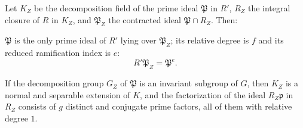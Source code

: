 Let $K_Z$ be the decomposition field of the prime ideal $\mathfrak{P}$ in $R'$, $R_Z$ the integral closure of $R$ in $K_Z$, and $\mathfrak{P}_Z$ the contracted ideal $\mathfrak{P} \cap R_Z$. Then:

$\mathfrak{P}$ is the only prime ideal of $R'$ lying over $\mathfrak{P}_Z$; its relative degree is $f$ and its reduced ramification index is $e$:
$$R'\mathfrak{P}_Z = \mathfrak{P}^e.$$

If the decomposition group $G_Z$ of $\mathfrak{P}$ is an invariant subgroup of $G$, then $K_Z$ is a normal and separable extension of $K$, and the factorization of the ideal $R_Z \mathfrak{p}$ in $R_Z$ consists of $g$ distinct and conjugate prime factors, all of them with relative degree $1$.
